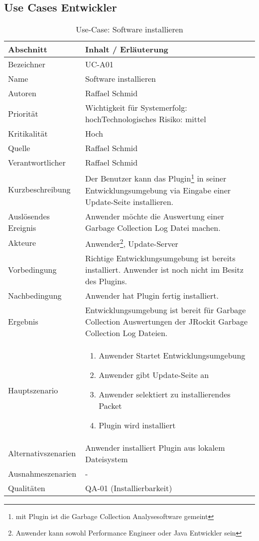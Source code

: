 \subsection{Use Cases Entwickler}
\begin{longtable}{|p{4cm}|p{10.5cm}|}
  \caption{Use-Case: Software installieren}\\\hline
   \textbf{Abschnitt} & \textbf{Inhalt / Erläuterung} \\\hline
   Bezeichner & UC-A01\\\hline
   Name & Software installieren\\\hline
   Autoren & Raffael Schmid\\\hline
   Priorität & Wichtigkeit für Systemerfolg: hoch\newline Technologisches Risiko: mittel\\\hline
   Kritikalität & Hoch\\\hline
   Quelle & Raffael Schmid\\\hline
   Verantwortlicher & Raffael Schmid\\\hline
   Kurzbeschreibung & Der Benutzer kann das Plugin\footnote{mit Plugin ist die Garbage Collection Analysesoftware gemeint} in seiner Entwicklungsumgebung via Eingabe einer Update-Seite installieren.\\\hline
   Auslösendes Ereignis & Anwender möchte die Auswertung einer Garbage Collection Log Datei machen.\\\hline
   Akteure & Anwender\footnote{Anwender kann sowohl Performance Engineer oder Java Entwickler sein}, Update-Server\\\hline
   Vorbedingung & Richtige Entwicklungsumgebung ist bereits installiert. Anwender ist noch nicht im Besitz des Plugins.\\\hline
   Nachbedingung & Anwender hat Plugin fertig installiert.\\\hline
   Ergebnis & Entwicklungsumgebung ist bereit für Garbage Collection Auswertungen der JRockit Garbage Collection Log Dateien.\\\hline
   Hauptszenario & 
         \begin{enumerate}
		\item Anwender Startet Entwicklungsumgebung
		\item Anwender gibt Update-Seite an
		\item Anwender selektiert zu installierendes Packet
		\item Plugin wird installiert	
 	\end{enumerate}
	\\\hline
   Alternativszenarien & Anwender installiert Plugin aus lokalem Dateisystem\\\hline
   Ausnahmeszenarien & -\\\hline
   Qualitäten & QA-01 (Installierbarkeit)\\\hline
\end{longtable}

